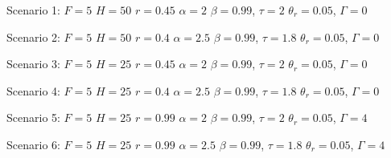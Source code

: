 \item Scenario 1: \(F=5\) \(H=50\)  \(r=0.45\) \(\alpha=2\) \(\beta=0.99\), \(\tau=2\) \(\theta_r=0.05\), \(\Gamma=0\)
\item Scenario 2: \(F=5\) \(H=50\)  \(r=0.4\) \(\alpha=2.5\) \(\beta=0.99\), \(\tau=1.8\) \(\theta_r=0.05\), \(\Gamma=0\)
\item Scenario 3: \(F=5\) \(H=25\)  \(r=0.45\) \(\alpha=2\) \(\beta=0.99\), \(\tau=2\) \(\theta_r=0.05\), \(\Gamma=0\)
\item Scenario 4: \(F=5\) \(H=25\)  \(r=0.4\) \(\alpha=2.5\) \(\beta=0.99\), \(\tau=1.8\) \(\theta_r=0.05\), \(\Gamma=0\)
\item Scenario 5: \(F=5\) \(H=25\)  \(r=0.99\) \(\alpha=2\) \(\beta=0.99\), \(\tau=2\) \(\theta_r=0.05\), \(\Gamma=4\)
\item Scenario 6: \(F=5\) \(H=25\)  \(r=0.99\) \(\alpha=2.5\) \(\beta=0.99\), \(\tau=1.8\) \(\theta_r=0.05\), \(\Gamma=4\)
